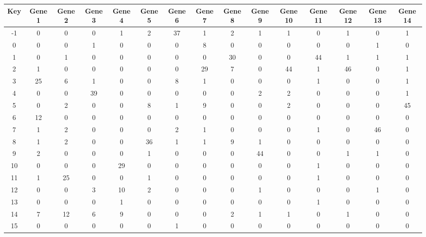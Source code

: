 \begin{tabular}{|c|c|c|c|c|c|c|c|c|c|c|c|c|c|c|}
\hline
Key & Gene 1 & Gene 2 & Gene 3 & Gene 4 & Gene 5 & Gene 6 & Gene 7 & Gene 8 & Gene 9 & Gene 10 & Gene 11 & Gene 12 & Gene 13 & Gene 14 \\
\hline
-1 & 0 & 0 & 0 & 1 & 2 & 37 & 1 & 2 & 1 & 1 & 0 & 1 & 0 & 1 \\
0 & 0 & 0 & 1 & 0 & 0 & 0 & 8 & 0 & 0 & 0 & 0 & 0 & 1 & 0 \\
1 & 0 & 1 & 0 & 0 & 0 & 0 & 0 & 30 & 0 & 0 & 44 & 1 & 1 & 1 \\
2 & 1 & 0 & 0 & 0 & 0 & 0 & 29 & 7 & 0 & 44 & 1 & 46 & 0 & 1 \\
3 & 25 & 6 & 1 & 0 & 0 & 8 & 1 & 0 & 0 & 0 & 1 & 0 & 0 & 1 \\
4 & 0 & 0 & 39 & 0 & 0 & 0 & 0 & 0 & 2 & 2 & 0 & 0 & 0 & 1 \\
5 & 0 & 2 & 0 & 0 & 8 & 1 & 9 & 0 & 0 & 2 & 0 & 0 & 0 & 45 \\
6 & 12 & 0 & 0 & 0 & 0 & 0 & 0 & 0 & 0 & 0 & 0 & 0 & 0 & 0 \\
7 & 1 & 2 & 0 & 0 & 0 & 2 & 1 & 0 & 0 & 0 & 1 & 0 & 46 & 0 \\
8 & 1 & 2 & 0 & 0 & 36 & 1 & 1 & 9 & 1 & 0 & 0 & 0 & 0 & 0 \\
9 & 2 & 0 & 0 & 0 & 1 & 0 & 0 & 0 & 44 & 0 & 0 & 1 & 1 & 0 \\
10 & 0 & 0 & 0 & 29 & 0 & 0 & 0 & 0 & 0 & 0 & 1 & 0 & 0 & 0 \\
11 & 1 & 25 & 0 & 0 & 1 & 0 & 0 & 0 & 0 & 0 & 1 & 0 & 0 & 0 \\
12 & 0 & 0 & 3 & 10 & 2 & 0 & 0 & 0 & 1 & 0 & 0 & 0 & 1 & 0 \\
13 & 0 & 0 & 0 & 1 & 0 & 0 & 0 & 0 & 0 & 0 & 1 & 0 & 0 & 0 \\
14 & 7 & 12 & 6 & 9 & 0 & 0 & 0 & 2 & 1 & 1 & 0 & 1 & 0 & 0 \\
15 & 0 & 0 & 0 & 0 & 0 & 1 & 0 & 0 & 0 & 0 & 0 & 0 & 0 & 0 \\
\hline
\end{tabular}